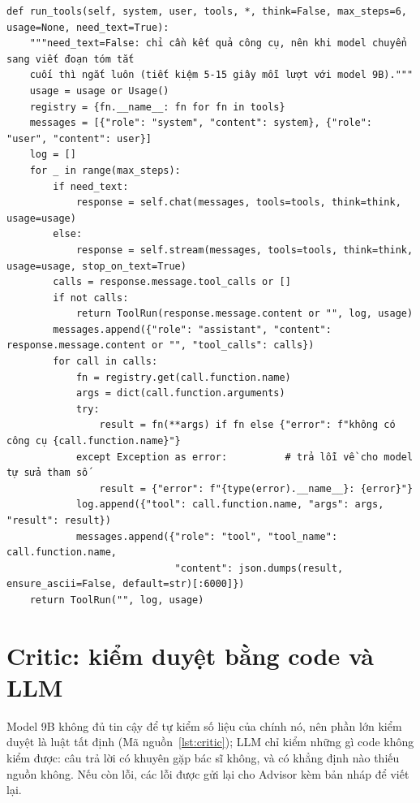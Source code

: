 \documentclass[12pt,a4paper]{report}
\begin{document}
\begin{listing}[H]
\begin{verbatim}
def run_tools(self, system, user, tools, *, think=False, max_steps=6, usage=None, need_text=True):
    """need_text=False: chỉ cần kết quả công cụ, nên khi model chuyển sang viết đoạn tóm tắt
    cuối thì ngắt luôn (tiết kiệm 5-15 giây mỗi lượt với model 9B)."""
    usage = usage or Usage()
    registry = {fn.__name__: fn for fn in tools}
    messages = [{"role": "system", "content": system}, {"role": "user", "content": user}]
    log = []
    for _ in range(max_steps):
        if need_text:
            response = self.chat(messages, tools=tools, think=think, usage=usage)
        else:
            response = self.stream(messages, tools=tools, think=think, usage=usage, stop_on_text=True)
        calls = response.message.tool_calls or []
        if not calls:
            return ToolRun(response.message.content or "", log, usage)
        messages.append({"role": "assistant", "content": response.message.content or "", "tool_calls": calls})
        for call in calls:
            fn = registry.get(call.function.name)
            args = dict(call.function.arguments)
            try:
                result = fn(**args) if fn else {"error": f"không có công cụ {call.function.name}"}
            except Exception as error:          # trả lỗi về cho model tự sửa tham số
                result = {"error": f"{type(error).__name__}: {error}"}
            log.append({"tool": call.function.name, "args": args, "result": result})
            messages.append({"role": "tool", "tool_name": call.function.name,
                             "content": json.dumps(result, ensure_ascii=False, default=str)[:6000]})
    return ToolRun("", log, usage)
\end{verbatim}
\caption{Vòng gọi công cụ, ngắt khi không cần đoạn tóm tắt (\texttt{agents/llm.py})}
\label{lst:tools}
\end{listing}

\section{Critic: kiểm duyệt bằng code và LLM}
Model 9B không đủ tin cậy để tự kiểm số liệu của chính nó, nên phần lớn kiểm duyệt là luật
tất định (Mã nguồn~\ref{lst:critic}); LLM chỉ kiểm những gì code không kiểm được: câu trả lời có
khuyên gặp bác sĩ không, và có khẳng định nào thiếu nguồn không. Nếu còn lỗi, các lỗi được gửi
lại cho Advisor kèm bản nháp để viết lại.
\end{document}
